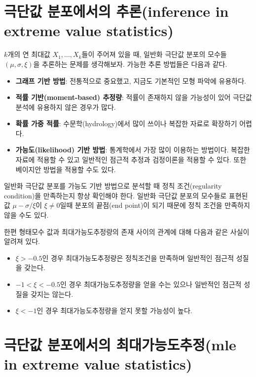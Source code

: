 \documentclass[b5paper,]{scrbook}
\theoremstyle{plain}
\theoremstyle{definition}
\numberwithin{equation}{section}
\begin{document}
\hypertarget{--inference-in-extreme-value-statistics}{%
\section{극단값 분포에서의 추론(inference in extreme value statistics)}\label{--inference-in-extreme-value-statistics}}

\(k\)개의 연 최대값 \(X_{1}, \ldots , X_{k}\)들이 주어져 있을 때, 일반화 극단값 분포의 모수들 \((\mu, \sigma, \xi)\)을 추론하는 문제를 생각해보자. 가능한 추론 방법들은 다음과 같다.

\begin{itemize}
\item
  \textbf{그래프 기반 방법}: 전통적으로 중요했고, 지금도 기본적인 모형 파악에 유용하다.
\item
  \textbf{적률 기반(moment-based) 추정량}: 적률이 존재하지 않을 가능성이 있어 극단값 분석에 유용하지 않은 경우가 많다.
\item
  \textbf{확률 가중 적률}: 수문학(hydrology)에서 많이 쓰이나 복잡한 자료로 확장하기 어렵다.
\item
  \textbf{가능도(likelihood) 기반 방법}: 통계학에서 가장 많이 이용하는 방법이다. 복잡한 자료에 적용할 수 있고 일반적인 점근적 추정과 검정이론을 적용할 수 있다. 또한 베이지안 방법을 적용할 수도 있다.
\end{itemize}

일반화 극단값 분포를 가능도 기반 방법으로 분석할 때 정칙 조건(regularity condition)을 만족하는지 항상 확인해야 한다. 일반화 극단값 분포의 모수들로 표현된 값 \(\mu-\sigma/\xi\)이 \(\xi\neq 0\)일때 분포의 끝점(end point)이 되기 때문에 정칙 조건을 만족하지 않을 수도 있다.\citep{Smith1985}

한편 형태모수 값과 최대가능도추정량의 존재 사이의 관계에 대해 다음과 같은 사실이 알려져 있다.

\begin{itemize}
\item
  \(\xi > -0.5\)인 경우 최대가능도추정량은 정칙조건을 만족하며 일반적인 점근적 성질을 갖는다.
\item
  \(-1 < \xi < -0.5\)인 경우 최대가능도추정량을 얻을 수는 있으나 일반적인 점근적 성질을 갖지는 않는다.
\item
  \(\xi < -1\)인 경우 최대가능도추정량을 얻지 못할 가능성이 높다.
\end{itemize}

\hypertarget{--mle-in-extreme-value-statistics}{%
\section{극단값 분포에서의 최대가능도추정(mle in extreme value statistics)}\label{--mle-in-extreme-value-statistics}}
\end{document}
